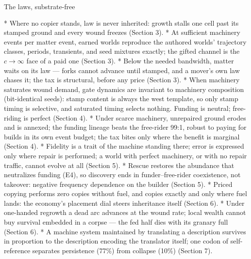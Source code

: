 \sec The laws, substrate-free

\begitems
*  Where no
copier stands, law is never inherited: growth stalls one cell
past its stamped ground and every wound freezes (Section 3).
*  At sufficient machinery events per matter event, earned
worlds reproduce the authored worlds' trajectory classes,
periods, transients, and seed mixtures exactly; the gifted
channel is the $c\to\infty$ face of a paid one (Section 3).
*  Below the needed
bandwidth, matter waits on its law --- forks cannot advance until
stamped, and a mover's own law chases it; the tax is structural,
before any price (Section 3).
*  When
machinery saturates wound demand, gate dynamics are invariant to
machinery composition (bit-identical seeds): stamp content is
always the west template, so only stamp timing is selective, and
saturated timing selects nothing. Funding is neutral; free-riding
is perfect (Section 4).
* 
Under scarce machinery, unrepaired ground erodes and is annexed;
the funding lineage beats the free-rider 99:1, robust to paying
for builds in its own event budget; the tax bites only where the
benefit is marginal (Section 4).
*  Fidelity
is a trait of the machine standing there; error is expressed only
where repair is performed; a world with perfect machinery, or
with no repair traffic, cannot evolve at all (Section 5).
*  Rescue
restores the abundance that neutralizes funding (E4), so
discovery ends in funder--free-rider coexistence, not takeover:
negative frequency dependence on the builder (Section 5).
*  Priced
copying performs zero copies without fuel, and copies exactly and
only where fuel lands: the economy's placement dial steers
inheritance itself (Section 6).
* 
Under one-handed regrowth a dead arc advances at the wound rate;
local wealth cannot buy survival embedded in a corpse --- the fed
half dies with its granary full (Section 6).
*  A machine system
maintained by translating a description survives in proportion to
the description encoding the translator itself; one codon of
self-reference separates persistence (77\%) from collapse (10\%)
(Section 7).
\enditems

